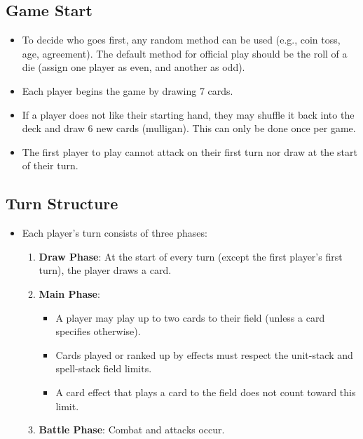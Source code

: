 \subsection{Game Start}
\begin{itemize}
    \item To decide who goes first, any random method can be used (e.g., coin toss, age, agreement). The default method for official play should be the roll of a die (assign one player as even, and another as odd).
    \item Each player begins the game by drawing 7 cards.
    \item If a player does not like their starting hand, they may shuffle it back into the deck and draw 6 new cards (mulligan). This can only be done once per game.
    \item The first player to play cannot attack on their first turn nor draw at the start of their turn.
\end{itemize}








\subsection{Turn Structure}
\begin{itemize}
\item Each player's turn consists of three phases:
	\begin{enumerate}
	    \item \textbf{Draw Phase}: At the start of every turn (except the first player's first turn), the player draws a card.
	    \item \textbf{Main Phase}:
	    \begin{itemize}
	        \item A player may play up to two cards to their field (unless a card specifies otherwise).	        
			\item Cards played or ranked up by effects must respect the unit-stack and spell-stack field limits.
	        \item A card effect that plays a card to the field does not count toward this limit.
	    \end{itemize}
	    \item \textbf{Battle Phase}: Combat and attacks occur.
	\end{enumerate}
\end{itemize}








